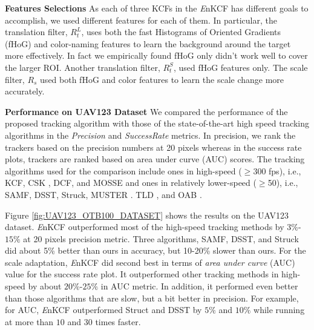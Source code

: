 \documentclass{bmvc2k}
\begin{document}
\textbf{Features Selections} As each of three KCFs in the {\it E}nKCF
has different goals to accomplish, we used different features for each
of them. In particular, the translation filter, $R_{t}^{L}$, uses both
the fast Histograms of Oriented Gradients
(fHoG)\cite{felzenszwalb2010object} and
color-naming\cite{van2009learning} features to learn the background
around the target more effectively. In fact we empirically found fHoG
only didn't work well to cover the larger ROI. Another translation
filter, $R_{t}^{S}$, used fHoG features only. The scale filter,
$R_{s}$ used both fHoG and color features to learn the scale change
more accurately.

\textbf{Performance on UAV123 Dataset} We compared the performance
of the proposed tracking algorithm with those of the state-of-the-art
high speed tracking algorithms in the \textit{Precision} and
\textit{Success\:Rate} metrics. In precision, we rank the trackers
based on the precision numbers at 20 pixels whereas in the success
rate plots, trackers are ranked based on area under curve (AUC)
scores. The tracking algorithms used for the comparison include ones
in high-speed ($\geq$300 fps), i.e., KCF\cite{henriques2015high}, CSK
\cite{henriques2012exploiting}, DCF\cite{henriques2015high}, and
MOSSE\cite{bolme2010visual,henriques2015high} and ones in relatively
lower-speed ($\geq$50), i.e., SAMF\cite{li2014scale},
DSST\cite{danelljan2014accurate}, Struck\cite{hare2012efficient},
MUSTER \cite{hong2015multi}. TLD \cite{kalal2012tracking}, and OAB
\cite{zhang2012robust}. 

Figure \ref{fig:UAV123_OTB100_DATASET} shows the results on the UAV123
dataset. {\it E}nKCF outperformed most of the high-speed tracking
methods by $3\%$-$15\%$ at 20 pixels precision metric. Three
algorithms, SAMF, DSST, and Struck did about 5\% better than ours in
accuracy, but 10-20\% slower than ours. For the scale adaptation, {\it
  E}nKCF did second best in terms of \textit{area under curve} (AUC)
value for the success rate plot. It outperformed other tracking
methods in high-speed by about $20\%$-$25\%$ in AUC metric. In
addition, it performed even better than those algorithms that are
slow, but a bit better in precision. For example, for AUC, {\it E}nKCF
outperformed Struct and DSST by $5\%$ and $10\%$ while running at more
than $10$ and $30$ times faster.
\end{document}
